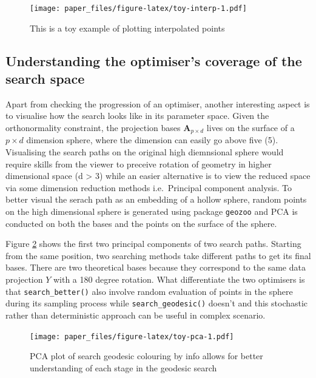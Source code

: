 \documentclass[12pt]{article}
\begin{document}
\begin{figure}
\centering
\texttt{[image: paper\_files/figure-latex/toy-interp-1.pdf]}
\caption{\label{fig:toy-interp}\label{toy-interp} This is a toy example of plotting interpolated points}
\end{figure}

\hypertarget{understanding-the-optimisers-coverage-of-the-search-space}{%
\subsection{Understanding the optimiser's coverage of the search space}\label{understanding-the-optimisers-coverage-of-the-search-space}}

Apart from checking the progression of an optimiser, another interesting aspect is to visualise how the search looks like in its parameter space. Given the orthonormality constraint, the projection bases \(\mathbf{A}_{p \times d}\) lives on the surface of a \(p \times d\) dimension sphere, where the dimension can easily go above five (5). Visualising the search paths on the original high diemnsional sphere would require skills from the viewer to preceive rotation of geometry in higher dimensional space (d \textgreater{} 3) while an easier alternative is to view the reduced space via some dimension reduction methods i.e.~Principal component analysis. To better visual the serach path as an embedding of a hollow sphere, random points on the high dimensional sphere is generated using package \texttt{geozoo} and PCA is conducted on both the bases and the points on the surface of the sphere.

Figure \ref{toy-pca} shows the first two principal components of two search paths. Starting from the same position, two searching methods take different paths to get its final bases. There are two theoretical bases because they correspond to the same data projection \(Y\) with a 180 degree rotation. What differentiate the two optimisers is that \texttt{search\_better()} also involve random evaluation of points in the sphere during its sampling process while \texttt{search\_geodesic()} doesn't and this stochastic rather than deterministic approach can be useful in complex scenario.

\begin{figure}
\centering
\texttt{[image: paper\_files/figure-latex/toy-pca-1.pdf]}
\caption{\label{fig:toy-pca}\label{toy-pca}PCA plot of search geodesic colouring by info allows for better understanding of each stage in the geodesic search}
\end{figure}
\end{document}
